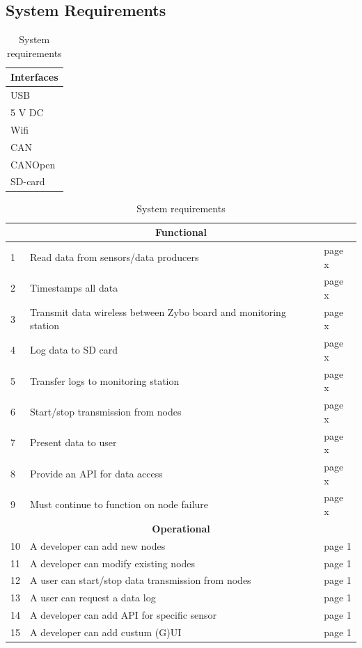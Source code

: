 \subsection{System Requirements} %
\label{sec:system_requirements}


\begin{table}[h]
\centering
\caption{System requirements}
\label{tab:requirements}

\begin{tabular}{ |p{3cm}| }
	\hline
	\multicolumn{1}{|c|}{\textbf{Interfaces}}\\
	\hline
	\centering
	USB \\
	5 V DC \\
	Wifi \\
	CAN \\
	CANOpen \\
	SD-card \\
\end{tabular}


\begin{tabular}{ |p{0.3cm}|p{8.5cm}|p{1cm}| }
\hline
\multicolumn{3}{|c|}{\textbf{Functional}}\\
\hline
1 & Read data from sensors/data producers 				& page x \\
2 & Timestamps all data 								& page x \\
3 & Transmit data wireless between Zybo board and monitoring station	& page x \\
4 & Log data to SD card 								& page x \\
5 & Transfer logs to monitoring station 								& page x \\
6 & Start/stop transmission from nodes 					& page x \\
7 & Present data to user								& page x \\
8 & Provide an API for data access						& page x \\
9 & Must continue to function on node failure			& page x \\

\hline
\multicolumn{3}{|c|}{\textbf{Operational}}\\
\hline	
10 & A developer can add new nodes 						& page 1 \\
11 & A developer can modify existing nodes 				& page 1 \\
12 & A user can start/stop data transmission from nodes	& page 1 \\
13 & A user can request a data log 						& page 1 \\
14 & A developer can add API for specific sensor 		& page 1 \\
15 & A developer can add custum (G)UI					& page 1 \\



\end{tabular}
\end{table}
